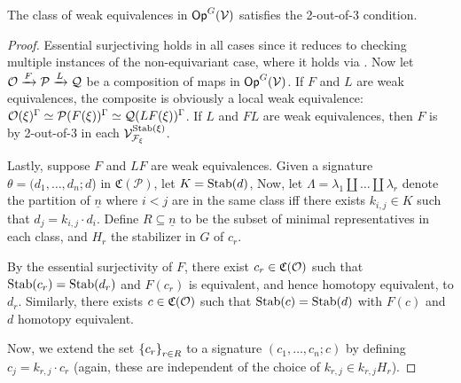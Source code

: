 \documentclass[psamsfonts,oneside,10pt,letterpaper
,draft
]{amsart}%
\renewcommand{\C}{\ensuremath{\mathfrak{C}}}
\renewcommand{\F}{\mathcal F}
\renewcommand{\1}{\ensuremath{\mathbb{id}}}
\renewcommand{\P}{\ensuremath{\mathcal{P}}}
\newcommand{\Q}{\ensuremath{\mathcal{Q}}}
\begin{document}
\begin{proposition}
      \label{CAV_4.15_PROP}
      The class of weak equivalences in $\mathsf{Op}^G(\mathcal V)$ satisfies the 2-out-of-3 condition.
\end{proposition}
\begin{proof}
      Essential surjectiving holds in all cases since it reduces to checking multiple instances of the non-equivariant case,
      where it holds via \cite[4.15]{Cav14}.
      Now let $\O \xrightarrow{F} \P \xrightarrow{L} \Q$ be a composition of maps in $\mathsf{Op}^G(\mathcal V)$.
      If $F$ and $L$ are weak equivalences,
      the composite is obviously a local weak equivalence:
      $\O(\ksi)^\Gamma \simeq \P(F(\ksi))^\Gamma \simeq \Q(LF(\ksi))^\Gamma$.
      If $L$ and $FL$ are weak equivalences,
      then $F$ is by 2-out-of-3 in each $\V^{\Stab(\ksi)}_{\F_\ksi}$.

      Lastly, suppose $F$ and $LF$ are weak equivalences.
      Given a signature $\theta = (d_1,\ldots,d_n;d$) in $\C(\P)$, let $K = \mathrm{Stab}(d)$,
      Now, let $\Lambda = \lambda_1 \amalg \dots \amalg \lambda_r$ denote the partition of $\underline{n}$
      where $i < j$ are in the same class iff there exists $k_{i,j} \in K$ such that $d_j = k_{i,j} \cdot d_i$.
      Define $R \subseteq \underline{n}$ to be the subset of minimal representatives in each class,
      and $H_r$ the stabilizer in $G$ of $c_r$.

      By the essential surjectivity of $F$, there exist $c_r \in \C(\O)$ such that
      $\mathrm{Stab}(c_r) = \mathrm{Stab}(d_r)$ and $F(c_r)$ is equivalent, and hence homotopy equivalent, to $d_r$.
      Similarly, there exists $c\in \C(\O)$ such that $\mathrm{Stab}(c) = \mathrm{Stab}(d)$ with $F(c)$ and $d$ homotopy equivalent. 

      Now, we extend the set $\left\{c_r\right\}_{r\in R}$ to a signature $(c_1,\ldots, c_n;c)$ by defining $c_j = k_{r,j} \cdot c_r$
      (again, these are independent of the choice of $k_{r,j} \in k_{r,j}H_r$).


\end{proof}
\end{document}
